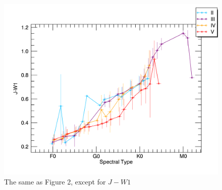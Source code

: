 \begin{figure}[t]
\centering  
\includegraphics[width=1.0\textwidth,clip=true]{Figures/subtype_bar/SPT_J-W1.png}
\caption{The same as Figure 2, except for $J-W1$}
\end{figure}









